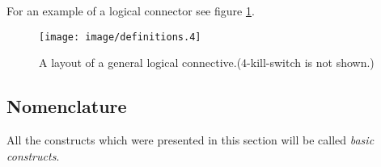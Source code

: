 For an example of a logical connector see figure
\ref{figure:connective}. 
\begin{figure}
	\begin{center}
		\texttt{[image: image/definitions.4]}
	\end{center}
	\caption{A layout of a general logical connective.($4$-kill-switch is not shown.)}\label{figure:connective}
\end{figure}

\subsection{Nomenclature}

All the constructs which were presented in this section will be called
\emph{basic constructs}.
